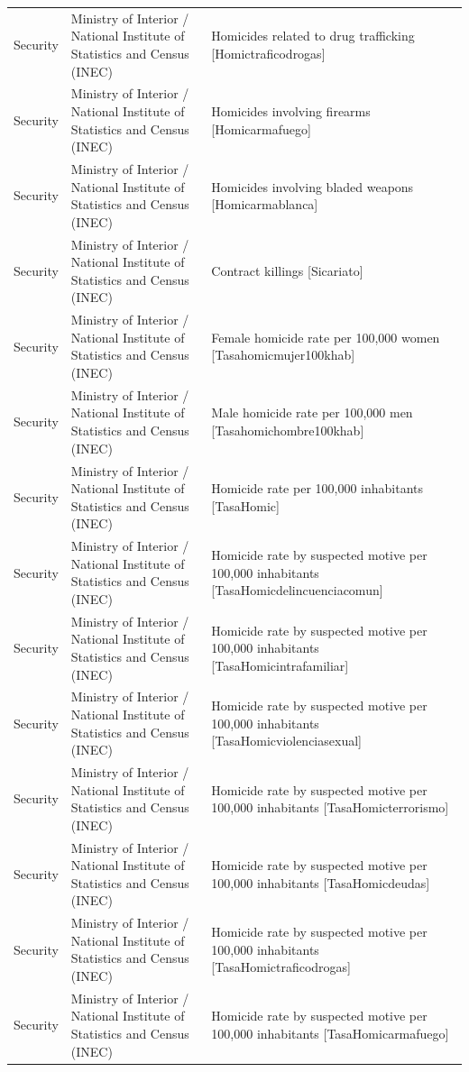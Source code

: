 \begin{landscape}
\begin{longtable}[t]{>{\raggedright\arraybackslash}p{3.4cm}>{\raggedright\arraybackslash}p{5.6cm}>{\raggedright\arraybackslash}p{12.4cm}}
Security & Ministry of Interior / National Institute of Statistics and Census (INEC) & Homicides related to drug trafficking [Homictraficodrogas]\\
Security & Ministry of Interior / National Institute of Statistics and Census (INEC) & Homicides involving firearms [Homicarmafuego]\\
Security & Ministry of Interior / National Institute of Statistics and Census (INEC) & Homicides involving bladed weapons [Homicarmablanca]\\
Security & Ministry of Interior / National Institute of Statistics and Census (INEC) & Contract killings [Sicariato]\\
Security & Ministry of Interior / National Institute of Statistics and Census (INEC) & Female homicide rate per 100,000 women [Tasahomicmujer100khab]\\
Security & Ministry of Interior / National Institute of Statistics and Census (INEC) & Male homicide rate per 100,000 men [Tasahomichombre100khab]\\
Security & Ministry of Interior / National Institute of Statistics and Census (INEC) & Homicide rate per 100,000 inhabitants [TasaHomic]\\
Security & Ministry of Interior / National Institute of Statistics and Census (INEC) & Homicide rate by suspected motive per 100,000 inhabitants [TasaHomicdelincuenciac\allowbreak{}omun]\\
Security & Ministry of Interior / National Institute of Statistics and Census (INEC) & Homicide rate by suspected motive per 100,000 inhabitants [TasaHomicintrafamiliar]\\
Security & Ministry of Interior / National Institute of Statistics and Census (INEC) & Homicide rate by suspected motive per 100,000 inhabitants [TasaHomicviolenciasexu\allowbreak{}al]\\
Security & Ministry of Interior / National Institute of Statistics and Census (INEC) & Homicide rate by suspected motive per 100,000 inhabitants [TasaHomicterrorismo]\\
Security & Ministry of Interior / National Institute of Statistics and Census (INEC) & Homicide rate by suspected motive per 100,000 inhabitants [TasaHomicdeudas]\\
Security & Ministry of Interior / National Institute of Statistics and Census (INEC) & Homicide rate by suspected motive per 100,000 inhabitants [TasaHomictraficodrogas]\\
Security & Ministry of Interior / National Institute of Statistics and Census (INEC) & Homicide rate by suspected motive per 100,000 inhabitants [TasaHomicarmafuego]\\

\end{longtable}
\end{landscape}
